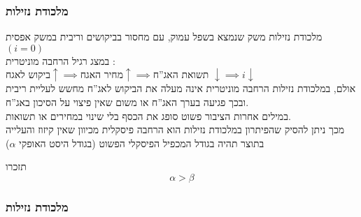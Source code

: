 \documentclass[usenames,dvipsnames]{beamer}
\renewcommand{\a}{\alpha}
\begin{document}
\begin{RTL}
\begin{frame}
\begin{center}
    \end{center}
\end{frame}

\begin{frame}
    \frametitle{מלכודת נזילות}
    \begin{block}{מלכודת נזילות}
        משק שנמצא בשפל עמוק, עם מחסור בביקושים וריבית במשק אפסית $(i=0)$ \\
        במצג רגיל הרחבה מוניטרית : \\
        $\text{ביקוש לאגח} \uparrow \implies \text{מחיר האגח} \uparrow \implies \text{תשואת האג''ח }\downarrow \implies i\downarrow$ \\
        אולם, במלכודת נזילות הרחבה מוניטרית אינה מעלה את הביקוש לאג''ח מחשש לעליית ריבית ובכך פגיעה בערך האג''ח או משום שאין פיצוי על הסיכון באג''ח. \\
        במילים אחרות הציבור פשוט סופג את הכסף בלי שינוי במחירים או תשואות. \\
        מכך ניתן להסיק שהפיתרון במלכודת נזילות הוא הרחבה פיסקלית מכיוון שאין קיזוז והעלייה בתוצר תהיה בגודל המכפיל הפיסקלי הפשוט (בגודל היסט האופקי $\a$)
    \end{block}

    \begin{alertblock}{תזכרו}
        $$\a > \beta$$
    \end{alertblock}
    

\end{frame}

\begin{frame}
    \frametitle{מלכודת נזילות}

    \begin{center}
\end{center}
\end{frame}
\end{RTL}
\end{document}
